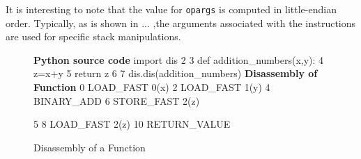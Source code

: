 \documentclass[12pt, a4paper]{report}
\newenvironment{code}
{\footnotesize\verbatim}{\endverbatim\normalfont}
\theoremstyle{definition}
\theoremstyle{definition}%
\theoremstyle{definition}%
\theoremstyle{definition}%
\theoremstyle{definition}%
\theoremstyle{definition}%
\begin{document}
{            It is interesting to note that the value for \lstinline|opargs| is computed in little-endian order. Typically, as is shown in ... ,the arguments associated with the instructions are used for 
            specific stack manipulations. 

            \begin{figure}
                \centering
                {\bfseries Python source code}
                \begin{code}
                1        import dis
                2        
                3        def addition_numbers(x,y):
                4            z=x+y
                5            return z
                6       
                7        dis.dis(addition_numbers)
                \end{code}
                {\bfseries Disassembly of Function}
                \begin{code}
                4       0 LOAD_FAST        0(x)
                        2 LOAD_FAST        1(y)
                        4 BINARY_ADD
                        6 STORE_FAST       2(z)
                
                5       8 LOAD_FAST        2(z)
                    10 RETURN_VALUE
                \end{code}

                \caption{Disassembly of a Function}
                \label{lst:dis_example}
            \end{figure}

}
\end{document}
